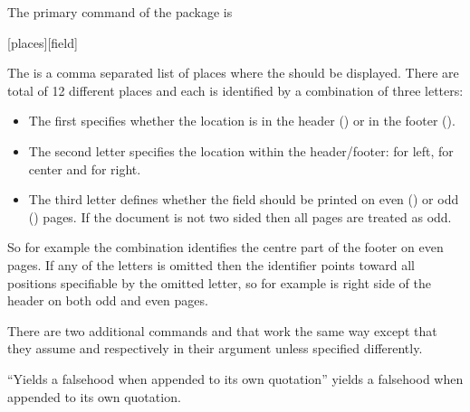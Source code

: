 The primary command of the package is
\begin{lscommand}
  [places][field]
\end{lscommand}
The  is a comma separated list of places where the  should be displayed. There are total of 12 different places and each is identified by a
combination of three letters:
\begin{itemize}
  \item The first specifies whether the location is in the header () or in the
  footer ().
  \item The second letter specifies the location within the header\slash{}footer:  for left,  for center and
   for right.
  \item The third letter defines whether the field should be printed on even
  () or odd () pages. If the document is not two sided then
  all pages are treated as odd.
\end{itemize}
So for example the combination  identifies the centre part of the
footer on even pages. If any of the letters is omitted then the identifier
points toward all positions specifiable by the omitted letter, so for example
 is right side of the header on both odd and even pages.

There are two additional commands  and  that work
the same way except that they assume  and  respectively
in their  argument unless specified differently.
\begin{example}[standalone, paperheight=3.5cm]
\geometry{includefoot, includehead, headsep=.5em, footskip=1em} %
\sloppy %
\usepackage{csquotes} %
\usepackage{fancyhdr}%
\pagestyle{fancy}%


\noindent %
\enquote{Yields a falsehood when
appended to its own quotation}
yields a falsehood when appended
to its own quotation.
\end{example}


